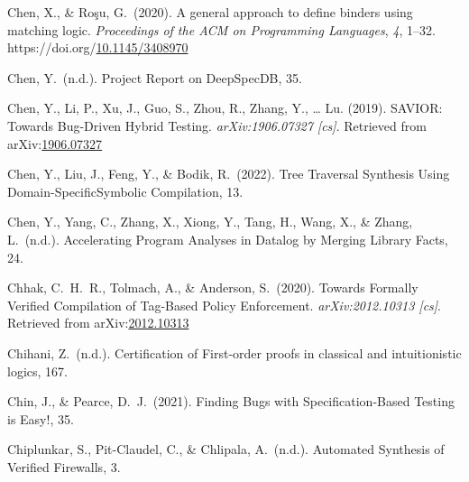\documentclass[12pt,twoside]{article}
\begin{document}
{\begin{thebibliography}{1079}
\mdbibitemlabel{}Chen, X., \& Roşu, G.~(2020). A general approach to define binders using matching logic. \emph{Proceedings of the ACM on Programming Languages}, \emph{4}, 1–32. https://doi.org/\href{https://dx.doi.org/10.1145/3408970}{10.1145/3408970}%

\mdbibitemlabel{}Chen, Y.~(n.d.). Project Report on DeepSpecDB, 35.%

\mdbibitemlabel{}Chen, Y., Li, P., Xu, J., Guo, S., Zhou, R., Zhang, Y., … Lu. (2019). SAVIOR: Towards Bug-Driven Hybrid Testing. \emph{arXiv:1906.07327 {}[cs]}. Retrieved from arXiv:\href{http://arxiv.org/abs/1906.07327}{1906.07327}%

\mdbibitemlabel{}Chen, Y., Liu, J., Feng, Y., \& Bodik, R.~(2022). Tree Traversal Synthesis Using Domain-SpecificSymbolic Compilation, 13.%

\mdbibitemlabel{}Chen, Y., Yang, C., Zhang, X., Xiong, Y., Tang, H., Wang, X., \& Zhang, L.~(n.d.). Accelerating Program Analyses in Datalog by Merging Library Facts, 24.%

\mdbibitemlabel{}Chhak, C.~H.~R., Tolmach, A., \& Anderson, S.~(2020). Towards Formally Verified Compilation of Tag-Based Policy Enforcement. \emph{arXiv:2012.10313 {}[cs]}. Retrieved from arXiv:\href{http://arxiv.org/abs/2012.10313}{2012.10313}%

\mdbibitemlabel{}Chihani, Z.~(n.d.). Certiﬁcation of First-order proofs in classical and intuitionistic logics, 167.%

\mdbibitemlabel{}Chin, J., \& Pearce, D.~J.~(2021). Finding Bugs with Speciﬁcation-Based Testing is Easy!, 35.%

\mdbibitemlabel{}Chiplunkar, S., Pit-Claudel, C., \& Chlipala, A.~(n.d.). Automated Synthesis of Verified Firewalls, 3.%


\end{thebibliography}}
\end{document}
